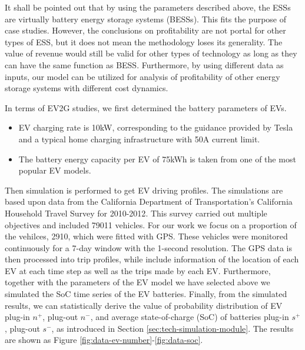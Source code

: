 It shall be pointed out that by using the parameters described above, the ESSs are virtually battery energy storage systems (BESSs). This fits the purpose of case studies. However, the conclusions on profitability are not portal for other types of ESS, but it does not mean the methodology loses its generality. The value of revenue would still be valid for other types of technology as long as they can have the same function as BESS. Furthermore, by using different data as inputs, our model can be utilized for analysis of profitability of other energy storage systems with different cost dynamics. 

In terms of EV2G studies, we first determined the battery parameters of EVs.

\begin{itemize}
	\item EV charging rate is 10kW, corresponding to the guidance provided by Tesla\cite{Tesla2} and a typical home charging infrastructure with 50A current limit. 
	\item The battery energy capacity per EV of 75kWh is taken from one of the most popular EV models\cite{Tesla3}.
\end{itemize}

Then simulation is performed to get EV driving profiles. The simulations are based upon data from the California Department of Transportation's California Household Travel Survey for 2010-2012\cite{NREL_TSDC}. This survey carried out multiple objectives and included 79011 vehicles. For our work we focus on a proportion of the vehilces, 2910, which were fitted with GPS. These vehicles were monitored continuously for a 7-day window with the 1-second resolution. The GPS data is then processed into trip profiles, while include information of the location of each EV at each time step as well as the trips made by each EV. Furthermore, together with the parameters of the EV model we have selected above we simulated the SoC time series of the EV batteries. Finally, from the simulated results, we can statistically derive the value of probability distribution of EV plug-in $n^+$, plug-out $n^-$, and average state-of-charge (SoC) of batteries plug-in $s^+$, plug-out $s^-$, as introduced in Section \ref{sec:tech-simulation-module}. The results are shown as Figure \ref{fig:data-ev-number}-\ref{fig:data-soc}.

